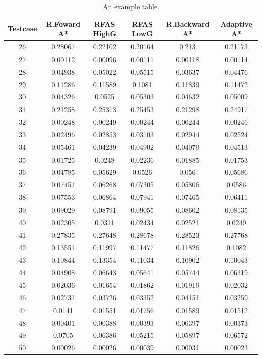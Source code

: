\documentclass[12pt]{article}
\begin{document}
		\begin{table}[!htb]
			\centering
			\begin{tabular}{|c|c|c|c|c|c|}
				Testcase & R.Foward A* &  RFAS HighG & RFAS LowG & R.Backward A* & Adaptive A*\\\hline
				26&0.28067&0.22102&0.20164&0.213&0.21173\\
				27&0.00112&0.00096&0.00111&0.00118&0.00114\\
				28&0.04938&0.05022&0.05515&0.03637&0.04476\\
				29&0.11286&0.11589&0.1081&0.11839&0.11472\\
				30&0.04326&0.0525&0.05303&0.04632&0.05009\\
				31&0.21258&0.25313&0.25453&0.21298&0.24917\\
				32&0.00248&0.00249&0.00244&0.00244&0.00246\\
				33&0.02496&0.02853&0.03103&0.02944&0.02524\\
				34&0.05461&0.04239&0.04902&0.04079&0.04513\\
				35&0.01725&0.0248&0.02236&0.01885&0.01753\\
				36&0.04785&0.05629&0.0526&0.056&0.05686\\
				37&0.07451&0.06268&0.07305&0.05806&0.0586\\
				38&0.07553&0.06864&0.07941&0.07465&0.06411\\
				39&0.09029&0.08791&0.09055&0.08602&0.08135\\
				40&0.02305&0.0311&0.02434&0.02521&0.0249\\
				41&0.27835&0.27648&0.28678&0.28523&0.27768\\
				42&0.13551&0.11997&0.11477&0.11826&0.1082\\
				43&0.10844&0.13354&0.11034&0.10902&0.10043\\
				44&0.04908&0.06643&0.05641&0.05744&0.06319\\
				45&0.02036&0.01654&0.01862&0.01919&0.02032\\
				46&0.02731&0.03726&0.03352&0.04151&0.03259\\
				47&0.0141&0.01551&0.01756&0.01589&0.01512\\
				48&0.00401&0.00388&0.00393&0.00397&0.00373\\
				49&0.0705&0.06386&0.05215&0.05897&0.06572\\
				50&0.00026&0.00026&0.00039&0.00031&0.00023\\
			
			\end{tabular}
			\caption{\label{tab:widgets}An example table.}
		\end{table}
	\iffalse
\end{document}

